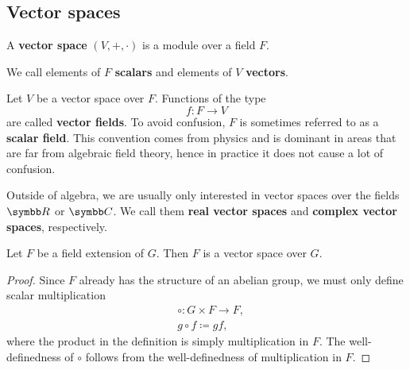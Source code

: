 \subsection{Vector spaces}\label{subsec:vector_spaces}

\begin{definition}\label{def:vector_space}
  A \textbf{vector space} \( (V, +, \cdot) \) is a module over a field \( F \).

  We call elements of \( F \) \textbf{scalars} and elements of \( V \) \textbf{vectors}.
\end{definition}

\begin{definition}\label{def:vector_field}
  Let \( V \) be a vector space over \( F \). Functions of the type
  \begin{equation*}
    f: F \to V
  \end{equation*}
  are called \textbf{vector fields}. To avoid confusion, \( F \) is sometimes referred to as a \textbf{scalar field}. This convention comes from physics and is dominant in areas that are far from algebraic field theory, hence in practice it does not cause a lot of confusion.
\end{definition}

\begin{remark}\label{remark:real_vector_space}
  Outside of algebra, we are usually only interested in vector spaces over the fields \( \BB{R} \) or \( \BB{C} \). We call them \textbf{real vector spaces} and \textbf{complex vector spaces}, respectively.
\end{remark}

\begin{proposition}\label{thm:field_extension_is_vector_space}
  Let \( F \) be a field extension of \( G \). Then \( F \) is a vector space over \( G \).
\end{proposition}
\begin{proof}
  Since \( F \) already has the structure of an abelian group, we must only define scalar multiplication
  \begin{align*}
    &\circ: G \times F \to F, \\
    &g \circ f \coloneqq gf,
  \end{align*}
  where the product in the definition is simply multiplication in \( F \). The well-definedness of \( \circ \) follows from the well-definedness of multiplication in \( F \).
\end{proof}

